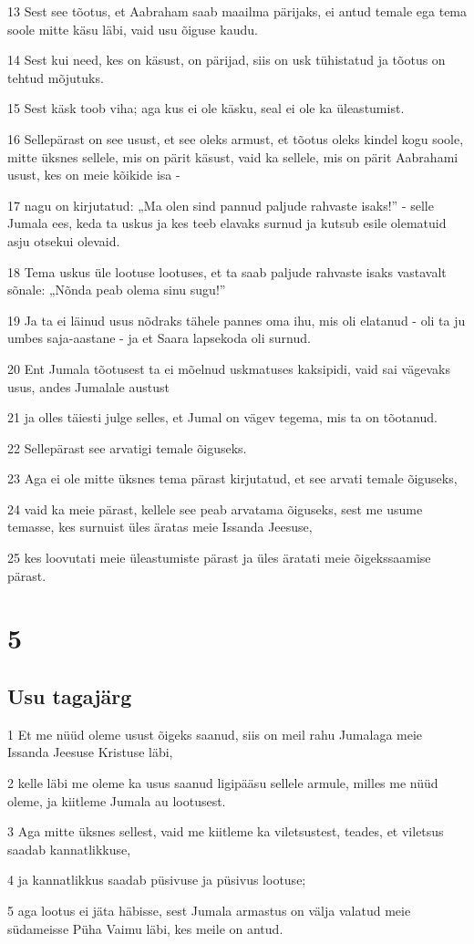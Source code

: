 \par 13 Sest see tõotus, et Aabraham saab maailma pärijaks, ei antud temale ega tema soole mitte käsu läbi, vaid usu õiguse kaudu.
\par 14 Sest kui need, kes on käsust, on pärijad, siis on usk tühistatud ja tõotus on tehtud mõjutuks.
\par 15 Sest käsk toob viha; aga kus ei ole käsku, seal ei ole ka üleastumist.
\par 16 Sellepärast on see usust, et see oleks armust, et tõotus oleks kindel kogu soole, mitte üksnes sellele, mis on pärit käsust, vaid ka sellele, mis on pärit Aabrahami usust, kes on meie kõikide isa -
\par 17 nagu on kirjutatud: „Ma olen sind pannud paljude rahvaste isaks!” - selle Jumala ees, keda ta uskus ja kes teeb elavaks surnud ja kutsub esile olematuid asju otsekui olevaid.
\par 18 Tema uskus üle lootuse lootuses, et ta saab paljude rahvaste isaks vastavalt sõnale: „Nõnda peab olema sinu sugu!”
\par 19 Ja ta ei läinud usus nõdraks tähele pannes oma ihu, mis oli elatanud - oli ta ju umbes saja-aastane - ja et Saara lapsekoda oli surnud.
\par 20 Ent Jumala tõotusest ta ei mõelnud uskmatuses kaksipidi, vaid sai vägevaks usus, andes Jumalale austust
\par 21 ja olles täiesti julge selles, et Jumal on vägev tegema, mis ta on tõotanud.
\par 22 Sellepärast see arvatigi temale õiguseks.
\par 23 Aga ei ole mitte üksnes tema pärast kirjutatud, et see arvati temale õiguseks,
\par 24 vaid ka meie pärast, kellele see peab arvatama õiguseks, sest me usume temasse, kes surnuist üles äratas meie Issanda Jeesuse,
\par 25 kes loovutati meie üleastumiste pärast ja üles äratati meie õigekssaamise pärast.


\chapter{5}

\section*{Usu tagajärg}

\par 1 Et me nüüd oleme usust õigeks saanud, siis on meil rahu Jumalaga meie Issanda Jeesuse Kristuse läbi,
\par 2 kelle läbi me oleme ka usus saanud ligipääsu sellele armule, milles me nüüd oleme, ja kiitleme Jumala au lootusest.
\par 3 Aga mitte üksnes sellest, vaid me kiitleme ka viletsustest, teades, et viletsus saadab kannatlikkuse,
\par 4 ja kannatlikkus saadab püsivuse ja püsivus lootuse;
\par 5 aga lootus ei jäta häbisse, sest Jumala armastus on välja valatud meie südameisse Püha Vaimu läbi, kes meile on antud.


